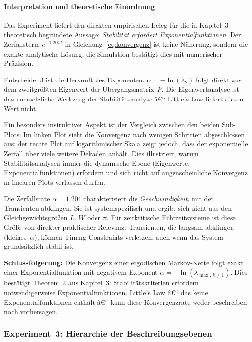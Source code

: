 ﻿\documentclass[a4paper,12pt]{scrreprt}
\theoremstyle{definition}
\begin{document}
\paragraph{Interpretation und theoretische Einordnung}

Das Experiment liefert den direkten empirischen Beleg für die in
Kapitel~3 theoretisch begründete Aussage: \emph{Stabilität erfordert
	Exponentialfunktionen}.  Der Zerfallsterm $e^{-1.204\,t}$ in
Gleichung~\eqref{eq:konvergenz} ist keine Näherung, sondern die exakte
analytische Lösung; die Simulation bestätigt dies mit numerischer
Präzision.

Entscheidend ist die Herkunft des Exponenten: $\alpha = -\ln(\lambda_2)$
folgt direkt aus dem zweitgrößten Eigenwert der Übergangsmatrix~$P$.
Die Eigenwertanalyse ist das unersetzliche Werkzeug der
Stabilitätsanalyse â€“ Little's Law liefert diesen Wert nicht.

Ein besonders instruktiver Aspekt ist der Vergleich zwischen den
beiden Sub-Plots: Im linken Plot sieht die Konvergenz nach wenigen
Schritten abgeschlossen aus; der rechte Plot auf logarithmischer
Skala zeigt jedoch, dass der exponentielle Zerfall über viele weitere
Dekaden anhält.  Dies illustriert, warum Stabilitätsanalysen immer
die dynamische Ebene (Eigenwerte, Exponentialfunktionen) erfordern
und sich nicht auf augenscheinliche Konvergenz in linearen Plots
verlassen dürfen.

Die Zerfallsrate $\alpha = 1.204$ charakterisiert die
\emph{Geschwindigkeit}, mit der Transienten abklingen.  Sie ist
systemspezifisch und ergibt sich nicht aus den Gleichgewichtsgrößen
$L$, $W$ oder $\pi$.  Für zeitkritische Echtzeitsysteme ist diese
Größe von direkter praktischer Relevanz: Transienten, die langsam
abklingen (kleines~$\alpha$), können Timing-Constraints verletzen,
auch wenn das System grundsätzlich stabil ist.

\textbf{Schlussfolgerung:} Die Konvergenz einer ergodischen
Markov-Kette folgt exakt einer Exponentialfunktion mit negativem
Exponent $\alpha = -\ln(\lambda_{\max,\,k \neq 1})$.  Dies bestätigt
Theorem~2 aus Kapitel~3: Stabilitätskriterien erfordern notwendigerweise
Exponentialfunktionen.  Little's Law â€“ das keine Exponentialfunktionen
enthält â€“ kann diese Konvergenzrate weder beschreiben noch vorhersagen.

\subsubsection{Experiment~3: Hierarchie der Beschreibungsebenen}
\label{subsubsec:exp3}
\end{document}
